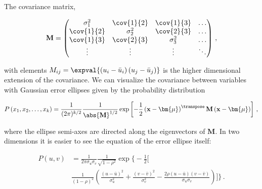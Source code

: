 The covariance matrix,

\begin{align}
  \mathbf{M} = \begin{pmatrix}
    \sigma_1^2   & \cov{1}{2} & \cov{1}{3} & \ldots \\
    \cov{1}{2}   & \sigma_2^2 & \cov{2}{3} & \ldots \\
    \cov{1}{3}   & \cov{2}{3} & \sigma_3^2 & \ldots \\
    \vdots       & \vdots     & \vdots     & \ddots
  \end{pmatrix}\,,
\end{align}

\noindent with elements $M_{ij} = \expval{\left(u_{i} - \bar{u}_{i}\right)\left(u_{j}-\bar{u}_{j}\right)}$
is the higher dimensional extension of the covariance.
We can visualize the covariance between variables with
Gaussian error ellipses given by the probability distribution

\begin{equation}\label{eq:stats:P_error_ellipse_k}
P\left(x_{1},x_{2},\ldots,x_{k}\right) = \frac{1}{(2\pi)^{k/2}}\frac{1}{\abs{\mathbf{M}}^{1/2}}\exp\left[-\frac{1}{2}\left(\mathbf{x}-\bm{\mu}\right)^{\transpose}\mathbf{M}\left(\mathbf{x}-\bm{\mu}\right)\right]\,,
\end{equation}

\noindent where the ellipse semi-axes are directed along the eigenvectors of $\mathbf{M}$.
In two dimensions it is easier to see the equation of the error ellipse itself:

\begin{equation}\label{eq:stats:P_error_ellipse_2}
\begin{split}
P\left(u,v\right) &= \frac{1}{2\pi\sigma_{u}\sigma_{v}}\frac{1}{\sqrt{1-\rho^{2}}}\exp\bigg\{-\frac{1}{2}\bigg[ \\
&\frac{1}{(1-\rho)^{2}}\left(\frac{\left(u-\bar{u}\right)^{2}}{\sigma_{u}^{2}}+\frac{\left(v-\bar{v}\right)^{2}}{\sigma_{v}^{2}}-\frac{2\rho \left(u-\bar{u}\right)\left(v-\bar{v}\right)}{\sigma_{u}\sigma_{v}}\right)\bigg]\bigg\}\,.
\end{split}
\end{equation}
